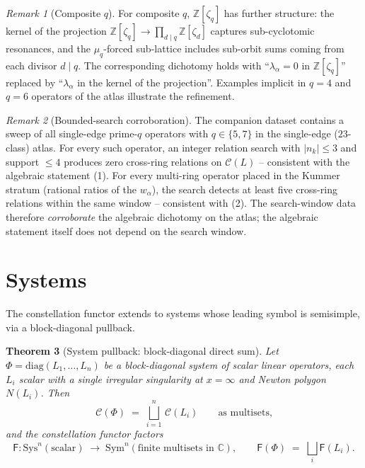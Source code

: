 \documentclass[aip,jmp,preprint,amsmath,amssymb,nofootinbib,floatfix]{revtex4-2}
\theoremstyle{plain}
\newtheorem{theorem}{Theorem}[section]
\theoremstyle{definition}
\theoremstyle{remark}
\newtheorem{remark}[theorem]{Remark}
\newcommand{\Cl}{\mathcal{C}}
\newcommand{\Fclass}{\mathsf{F}}
\newcommand{\Sys}{\mathrm{Sys}}
\newcommand{\Sym}{\mathrm{Sym}}
\newcommand{\Zlc}{\mathbb{Z}[\zeta_q]}
\begin{document}
\begin{remark}[Composite $q$]\label{rem:D2-composite}
For composite $q$, $\Zlc$ has further structure: the kernel of the
projection $\Zlc \to \prod_{d \mid q} \mathbb{Z}[\zeta_d]$ captures
sub-cyclotomic resonances, and the $\mu_q$-forced sub-lattice includes
sub-orbit sums coming from each divisor $d \mid q$. The corresponding
dichotomy holds with ``$\lambda_\alpha = 0$ in $\Zlc$'' replaced by
``$\lambda_\alpha$ in the kernel of the projection''. Examples implicit
in $q = 4$ and $q = 6$ operators of the atlas illustrate the refinement.
\end{remark}

\begin{remark}[Bounded-search corroboration]\label{rem:D2-search}
The companion dataset \cite{wkb_dataset_v1} contains a sweep of all
single-edge prime-$q$ operators with $q \in \{5, 7\}$ in the
single-edge ($23$-class) atlas. For every such operator, an integer
relation search with $|n_k| \le 3$ and support $\le 4$ produces zero
cross-ring relations on $\Cl(L)$ -- consistent with the algebraic
statement (1). For every multi-ring operator placed in
the Kummer stratum (rational ratios of the $w_\alpha$), the search
detects at least five cross-ring relations within the same window --
consistent with (2). The search-window data therefore
\emph{corroborate} the algebraic dichotomy on the atlas; the algebraic
statement itself does not depend on the search window.
\end{remark}


\section{Systems}\label{sec:systems}

The constellation functor extends to systems whose leading symbol is
semisimple, via a block-diagonal pullback.

\begin{theorem}[System pullback: block-diagonal direct sum]\label{thm:S1}
Let $\Phi = \mathrm{diag}(L_1, \dots, L_n)$ be a block-diagonal system of
scalar linear operators, each $L_i$ scalar with a single irregular
singularity at $x = \infty$ and Newton polygon $N(L_i)$. Then
\[
   \Cl(\Phi) \;=\; \bigsqcup_{i = 1}^{n}\, \Cl(L_i)
   \qquad \text{as multisets,}
\]
and the constellation functor factors
\[
   \Fclass \colon \Sys^n(\mathrm{scalar}) \;\longrightarrow\;
   \Sym^n(\text{finite multisets in } \mathbb{C}),
   \qquad \Fclass(\Phi) \;=\; \bigsqcup_i \Fclass(L_i).
\]
\end{theorem}
\end{document}
